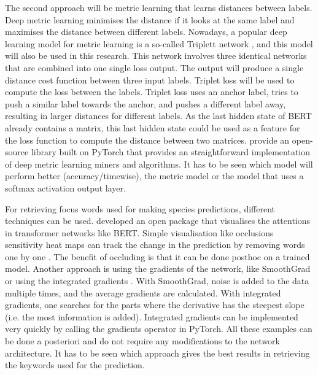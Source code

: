 \documentclass[a4paper, 12pt, oneside]{book} %
\begin{document}
The second approach will be metric learning that learns distances between labels.
Deep metric learning minimises the distance if it looks at the same label and maximises the distance between different labels.
Nowadays, a popular deep learning model for metric learning is a so-called Triplett network \autocite{hoffer_deep_2015}, and this model will also be used in this research.
This network involves three identical networks that are combined into one single loss output.
The output will produce a single distance cost function between three input labels.
Triplet loss \autocite{schroff_facenet_2015} will be used to compute the loss between the labels.
Triplet loss uses an anchor label, tries to push a similar label towards the anchor, and pushes a different label away, resulting in larger distances for different labels.
As the last hidden state of BERT already contains a matrix, this last hidden state could be used as a feature for the loss function to compute the distance between two matrices.
\textcite{musgrave_pytorch_2020} provide an open-source library built on PyTorch that provides an straightforward implementation of deep metric learning miners and algorithms.
It has to be seen which model will perform better (accuracy/timewise), the metric model or the model that uses a softmax activation output layer. 

For retrieving focus words used for making species predictions, different techniques can be used.
\textcite{vig_multiscale_2019} developed an open package that visualises the attentions in transformer networks like BERT.
Simple visualisation like occlusions sensitivity heat maps can track the change in the prediction by removing words one by one \autocite{fleet_visualizing_2014}.
The benefit of occluding is that it can be done posthoc on a trained model.
Another approach is using the gradients of the network, like SmoothGrad \autocite{smilkov_smoothgrad_2017} or using the integrated gradients \autocite{sundararajan_axiomatic_2017}.
With SmoothGrad, noise is added to the data multiple times, and the average gradients are calculated.
With integrated gradients, one searches for the parts where the derivative has the steepest slope (i.e. the most information is added).
Integrated gradients can be implemented very quickly by calling the gradients operator in PyTorch.
All these examples can be done a posteriori and do not require any modifications to the network architecture.
It has to be seen which approach gives the best results in retrieving the keywords used for the prediction.
\end{document}
